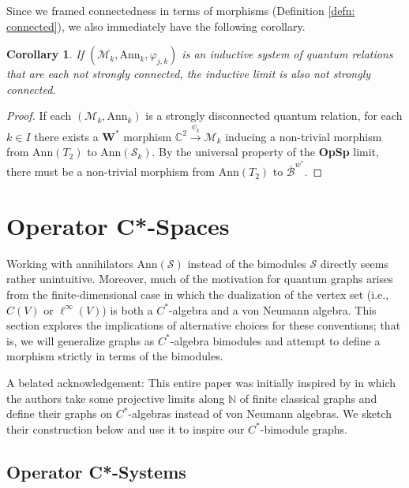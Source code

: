 \documentclass[12pt]{article}
\newtheorem{corollary}[theorem]{Corollary}
\theoremstyle{definition}
\newcommand{\N}{\mathbb N}
\newcommand{\C}{\mathbb C}
\newcommand{\mc}[1]{\mathcal{#1}}
\newcommand{\<}{\langle}
\renewcommand{\>}{\rangle}
\newcommand{\Ann}{\text{Ann}}
\begin{document}
Since we framed connectedness in terms of morphisms (Definition \ref{defn: connected}), we also immediately have the following corollary.

\begin{corollary}
    If $(\mc M_k, \Ann_k, \varphi_{j,k})$ is an inductive system of quantum relations that are each not strongly connected, the inductive limit is also not strongly connected.
\end{corollary}
\begin{proof}
    If each $(\mc M_k, \Ann_k)$ is a strongly disconnected quantum relation, for each $k \in I$ there exists a $\mathbf{W^*}$ morphism $\C^2 \overset{\psi_k}{\to} \mc M_k$ inducing a non-trivial morphism from $\Ann(T_2)$ to $\Ann(\mc S_k)$. By the universal property of the {\bf{OpSp}} limit, there must be a non-trivial morphism from $\Ann(T_2)$ to $\overline{\mc B}^{w^*}$. 
\end{proof}

\section{Operator C*-Spaces} \label{sec: opc*sp}

Working with annihilators $\Ann(\mc S)$ instead of the bimodules $\mc S$ directly seems rather unintuitive. Moreover, much of the motivation for quantum graphs arises from the finite-dimensional case in which the dualization of the vertex set (i.e., $C(V)$ or $\ell^\infty(V)$) is both a $C^*$-algebra and a von Neumann algebra. This section explores the implications of alternative choices for these conventions; that is, we will generalize graphs as $C^*$-algebra bimodules and attempt to define a morphism strictly in terms of the bimodules. 

A belated acknowledgement: This entire paper was initially inspired by \cite{mawtod} in which the authors take some projective limits along $\N$ of finite classical graphs and define their graphs on $C^*$-algebras instead of von Neumann algebras. We sketch their construction below and use it to inspire our $C^*$-bimodule graphs.

\subsection{Operator C*-Systems}
\end{document}
